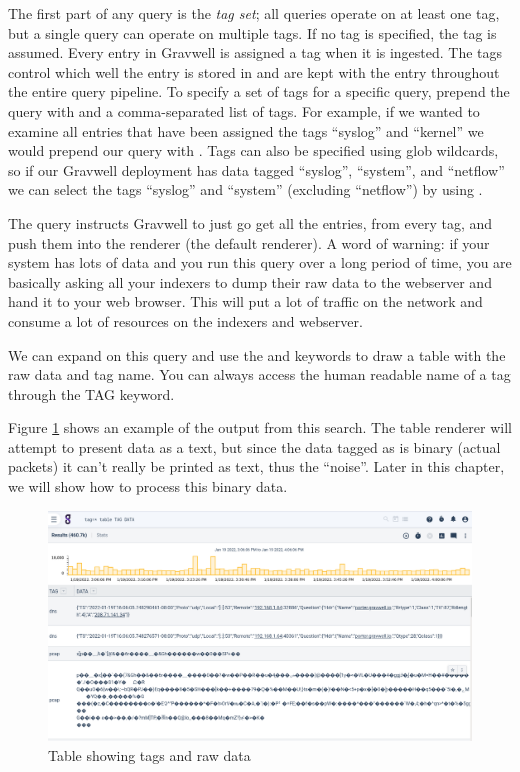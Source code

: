 The first part of any query is the \emph{tag set}; all queries operate on at
least one tag, but a single query can operate on multiple tags. If no
tag is specified, the  tag is assumed. Every entry in
Gravwell is assigned a tag when it is ingested. The tags control which
well the entry is stored in and are kept with the entry throughout the
entire query pipeline. To specify a set of tags for a specific query,
prepend the query with  and a comma-separated list of tags. For
example, if we wanted to examine all entries that have been assigned the
tags ``syslog'' and ``kernel'' we would prepend our query with
. Tags can also be specified using glob wildcards,
so if our Gravwell deployment has data tagged ``syslog'', ``system'', and
``netflow'' we can select the tags ``syslog'' and ``system'' (excluding ``netflow'') by using
. 

The query  instructs Gravwell to just go get all the entries,
from every tag, and push them into the  renderer (the default renderer).
A word of warning: if your system
has lots of data and you run this query over a long period of time, you are
basically asking all your indexers to dump their raw data to the
webserver and hand it to your web browser. This will put a lot of traffic on
the network and consume a lot of resources on the indexers and webserver.

We can expand on this query and use the  and  keywords to draw a
table with the raw data and tag name. You can always access the human
readable name of a tag through the TAG keyword.


Figure \ref{fig:tag-data-table} shows an example of the output from this search. The table renderer will attempt to present data as a text, but since
the data tagged as  is binary (actual packets) it can't really
be printed as text, thus the ``noise''. Later in this chapter, we will show how to
process this binary data.

\begin{figure}
	\includegraphics{images/table-tag-data.png}
	\caption{Table showing tags and raw data}
	\label{fig:tag-data-table}
\end{figure}





